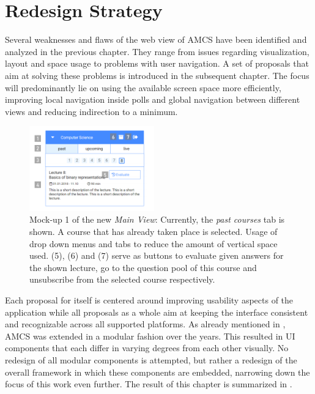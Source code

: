\chapter{Redesign Strategy}
\label{chapter:redesignstrategy}
Several weaknesses and flaws of the web view of AMCS have been identified and analyzed in the previous chapter. They range from issues regarding visualization, layout and space usage to problems with user navigation.
A set of proposals that aim at solving these problems is introduced in the subsequent chapter. The focus will predominantly lie on using the available screen space more efficiently, improving local navigation inside polls and global navigation between different views and reducing indirection to a minimum.
\begin{figure}
	\vspace*{-0.5cm}
	\begin{center}
		\includegraphics[width=0.48\textwidth]{mockups/main_view_enhancement_v1_annotated.png}
	\end{center}
	\captionsetup{format=plain}
	\caption{Mock-up 1 of the new \emph{Main View}: Currently, the \emph{past courses} tab is shown.
		A course that has already taken place is selected.
		Usage of drop down menus and tabs to reduce the amount of vertical space used. (5), (6) and (7) serve as buttons to evaluate given answers for the shown lecture, go to the question pool of this course and unsubscribe from the selected course respectively.
	}
	\label{figure:mainviewenhancement}
	\vspace*{-1.5cm}
\end{figure}
Each proposal for itself is centered around improving usability aspects of the application while all proposals as a whole aim at keeping the interface consistent and recognizable across all supported platforms.
As already mentioned in , AMCS was extended in a modular fashion over the years. This resulted in UI components that each differ in varying degrees from each other visually. 
No redesign of all modular components is attempted, but rather a redesign of the overall framework in which these components are embedded, narrowing down the focus of this work even further. The result of this chapter is summarized in .
